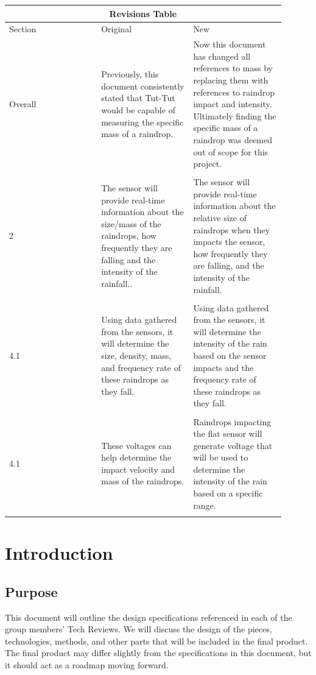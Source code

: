 \documentclass[letterpaper,10pt,draftclsnofoot,onecolumn]{article}
\begin{document}
\tableofcontents
\begin{center}
\begin{tabular}{ |p{0.3\linewidth}|p{0.3\linewidth}|p{0.3\linewidth}| }
\hline
\multicolumn{3}{|c|}{Revisions Table} \\
\hline
Section & Original & New \\
\hline
Overall &
Previously, this document consistently stated that Tut-Tut would be capable of measuring the specific mass of a raindrop. &
Now this document has changed all references to mass by replacing them with references to raindrop impact and intensity. Ultimately finding the specific mass of a raindrop was deemed out of scope for this project. \\
 && \\
2 &
The sensor will provide real-time information about the size/mass of the raindrops, how frequently they are falling and the intensity of the rainfall.. &
The sensor will provide real-time information about the relative size of raindrops when they impacts the sensor, how frequently they are falling, and the intensity of the rainfall. \\
 && \\
4.1 &
Using data gathered from the sensors, it will determine the size, density, mass, and frequency rate of these raindrops as they fall. &
Using data gathered from the sensors, it will determine the intensity of the rain based on the sensor impacts and the frequency rate of these raindrops as they fall.  \\
 && \\
4.1 &
These voltages can help determine the impact velocity and mass of the raindrops. &
Raindrops impacting the flat sensor will generate voltage that will be used to determine the intensity of the rain based on a specific range. \\
 && \\
\hline
\end{tabular}
\end{center}
\pagebreak

\section{Introduction}
\subsection{Purpose}
This document will outline the design specifications referenced in each of the group members' Tech Reviews. We will discuss the design of the pieces, technologies, methods, and other parts that will be included in the final product. The final product may differ slightly from the specifications in this document, but it should act as a roadmap moving forward.
\end{document}
